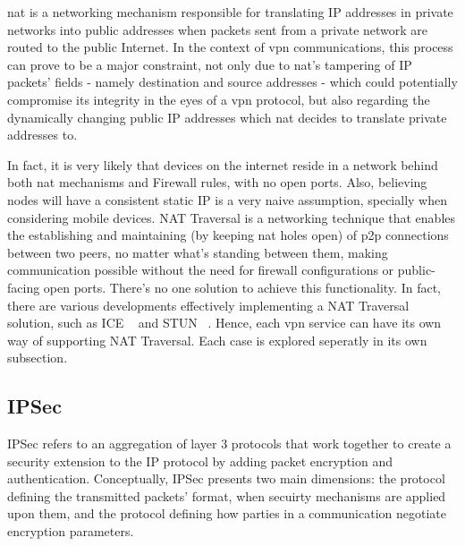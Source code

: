 \documentclass[11pt,twoside,a4paper]{report}
\begin{document}
\acrfull{nat} is a networking mechanism responsible for translating IP addresses in private networks into public addresses when packets sent from a private network are routed to the public Internet. In the context of \acrshort{vpn} communications, this process can prove to be a major constraint, not only due to \acrshort{nat}'s tampering of IP packets' fields - namely destination and source addresses - which could potentially compromise its integrity in the eyes of a \acrshort{vpn} protocol, but also regarding the dynamically changing public IP addresses which \acrshort{nat} decides to translate private addresses to.

In fact, it is very likely that devices on the internet reside in a network behind both \acrshort{nat} mechanisms and Firewall rules, with no open ports. Also, believing nodes will have a consistent static IP is a very naive assumption, specially when considering mobile devices. NAT Traversal is a networking technique that enables the establishing and maintaining (by keeping \acrshort{nat} holes open) of \acrshort{p2p} connections between two peers, no matter what's standing between them, making communication possible without the need for firewall configurations or public-facing open ports. There's no one solution to achieve this functionality. In fact, there are various developments effectively implementing a NAT Traversal solution, such as ICE ~\cite{rfc8445} and STUN ~\cite{rfc8489}. Hence, each \acrshort{vpn} service can have its own way of supporting NAT Traversal. Each case is explored seperatly in its own subsection.

\subsection{IPSec}

IPSec refers to an aggregation of layer 3 protocols that work together to create a security extension to the IP protocol by adding packet encryption and authentication. Conceptually, IPSec presents two main dimensions: the protocol defining the transmitted packets' format, when secuirty mechanisms are applied upon them, and the protocol defining how parties in a communication negotiate encryption parameters.
\end{document}
